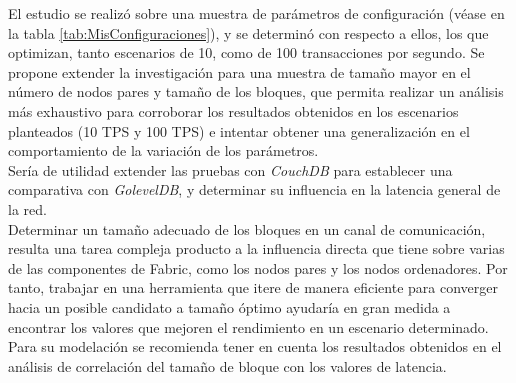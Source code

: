 \begin{recomendations}
El estudio se realiz\'o sobre una muestra de par\'ametros de configuraci\'on (v\'ease en la tabla \ref{tab:MisConfiguraciones}), y se determin\'o con respecto a ellos, los que optimizan, tanto escenarios de 10, como de 100 transacciones por segundo. Se propone extender la investigaci\'on para una muestra de tama\~no mayor en el n\'umero de nodos pares y tama\~no de los bloques, que permita realizar un an\'alisis m\'as exhaustivo para corroborar los resultados obtenidos en los escenarios planteados (10 TPS y 100 TPS) e intentar obtener una generalizaci\'on en el comportamiento de la variaci\'on de los par\'ametros.\\

Ser\'ia de utilidad extender las pruebas con \emph{CouchDB} para establecer una comparativa con \emph{GolevelDB}, y determinar su influencia en la latencia general de la red.\\

Determinar un tama\~no adecuado de los bloques en un canal de comunicaci\'on, resulta una tarea compleja producto a la influencia directa que tiene sobre varias de las componentes de Fabric, como los nodos pares y los nodos ordenadores. Por tanto, trabajar en una herramienta que itere de manera eficiente para converger hacia un posible candidato a tama\~no \'optimo ayudar\'ia en gran medida a encontrar los valores que mejoren el rendimiento en un escenario determinado. Para su modelaci\'on se recomienda tener en cuenta los resultados obtenidos en el an\'alisis de correlaci\'on del tama\~no de bloque con los valores de latencia.
\end{recomendations}
